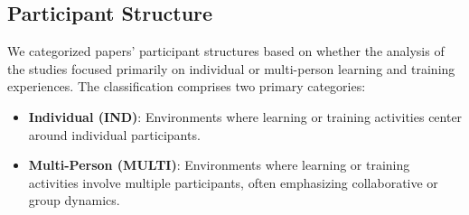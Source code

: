 \documentclass[manuscript,screen,review]{acmart}
\begin{document}




\subsection{Participant Structure} \label{subsec:participant_structure}


We categorized papers' participant structures based on whether the analysis of the studies focused primarily on individual or multi-person learning and training experiences. The classification comprises two primary categories: 
\begin{itemize}
    \item \textbf{Individual (IND)}: Environments where learning or training activities center around individual participants.
    \item \textbf{Multi-Person (MULTI)}: Environments where learning or training activities involve multiple participants, often emphasizing collaborative or group dynamics. 
\end{itemize}
\end{document}
